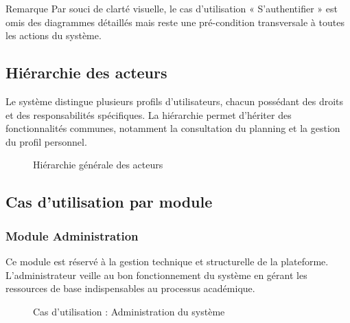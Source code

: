 \documentclass[12pt,a4paper]{article}
\begin{document}
\begin{projectbox}{Remarque}
    Par souci de clarté visuelle, le cas d'utilisation « S'authentifier » est omis des diagrammes détaillés mais reste une pré-condition transversale à toutes les actions du système.
\end{projectbox}

\subsection{Hiérarchie des acteurs}
\label{subsec:uml_acteurs}

Le système distingue plusieurs profils d'utilisateurs, chacun possédant des droits et des responsabilités spécifiques. La hiérarchie permet d'hériter des fonctionnalités communes, notamment la consultation du planning et la gestion du profil personnel.

\begin{figure}[H]
    \centering
    \caption{Hiérarchie générale des acteurs}
\end{figure}

\subsection{Cas d'utilisation par module}

\subsubsection{Module Administration}

Ce module est réservé à la gestion technique et structurelle de la plateforme. L'administrateur veille au bon fonctionnement du système en gérant les ressources de base indispensables au processus académique.

\begin{figure}[H]
    \centering
    \caption{Cas d'utilisation : Administration du système}
\end{figure}
\end{document}
